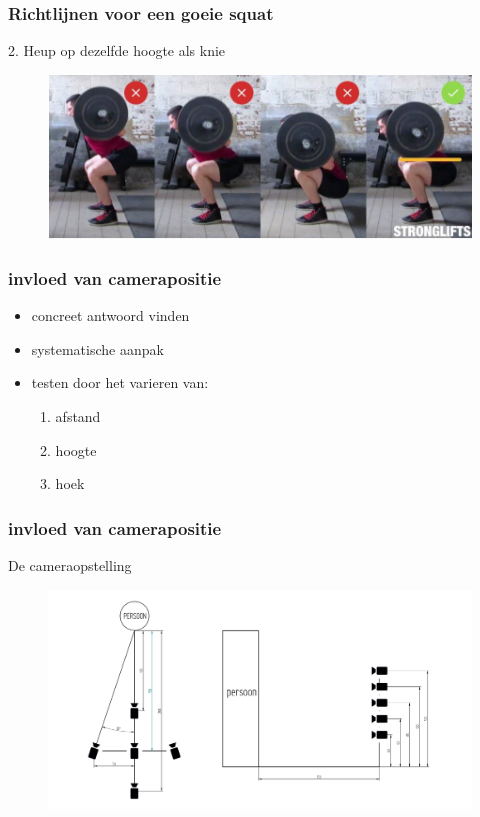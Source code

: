 \documentclass
   [kulak] %
   {kulakbeamer}
\begin{document}
\begin{frame}
\frametitle{Richtlijnen voor een goeie squat}
2. Heup op dezelfde hoogte als knie
\begin{figure}
	\includegraphics[width= \textwidth]{squat_heup}
\end{figure}
\end{frame}

\begin{frame}
	\frametitle{invloed van camerapositie}
	\begin{itemize}
		\item concreet antwoord vinden
		\item systematische aanpak
		\item testen door het varieren van:\begin{enumerate}
			\item afstand
			\item hoogte
			\item hoek
		\end{enumerate}
	\end{itemize}
\end{frame}

\begin{frame}
	\frametitle{invloed van camerapositie}
	De cameraopstelling
	\begin{figure}
		\includegraphics[width= \textwidth]{cameraopstelling}
	\end{figure}
\end{frame}
\end{document}

